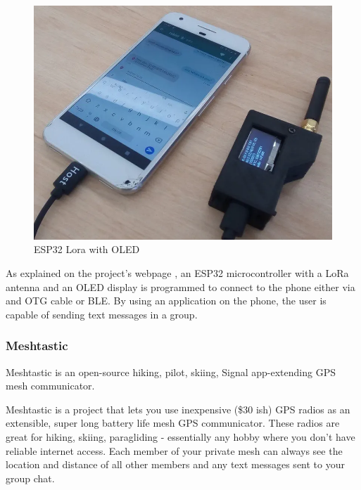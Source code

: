 				\noindent
				\begin{minipage}{0.5\textwidth}%
					\begin{figure}[H]
						\centering
						\includegraphics[width=.8\textwidth]{resources/img/chap4/lora-mesh-chat-5267d9}
						\caption{ESP32 Lora with OLED}
						\label{img:lora_mesh_chat}
					\end{figure}
				\end{minipage}%
				\hfill%
				\begin{minipage}{0.5\textwidth}\raggedright			
					As explained on the project's webpage \footnotemark, an ESP32 microcontroller with a LoRa antenna and an OLED display is programmed to connect to the phone either via and OTG cable or BLE.
					By using an application on the phone, the user is capable of sending text messages in a group.
				\end{minipage}			
				
				\subsubsection{Meshtastic}\label{subsubsec:meshtastic}
	
						
					Meshtastic is an open-source hiking, pilot, skiing, Signal app-extending GPS mesh communicator.
					
					Meshtastic is a project that lets you use inexpensive (\$30 ish) GPS radios as an extensible, super long battery life mesh GPS communicator. These radios are great for hiking, skiing, paragliding - essentially any hobby where you don’t have reliable internet access. Each member of your private mesh can always see the location and distance of all other members and any text messages sent to your group chat.
					
